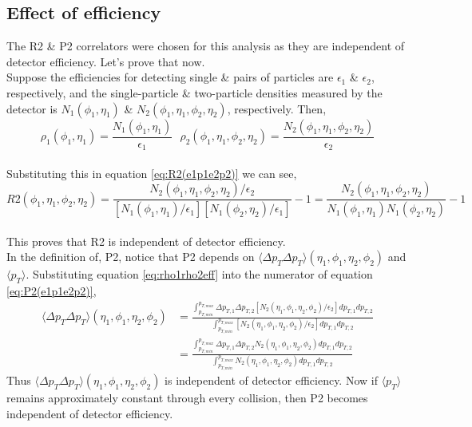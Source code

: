 \documentclass[12pt,a4paper,twoside]{report}
\begin{document}
\subsection{Effect of efficiency}
The R2 \& P2 correlators were chosen for this analysis as they are independent of detector efficiency. Let's prove that now.\\
Suppose the efficiencies for detecting single \& pairs of particles are $\epsilon_1$ \& $\epsilon_2$, respectively, and the single-particle \& two-particle densities measured by the detector is $N_1(\phi_1,\eta_1)$ \& $N_2(\phi_1,\eta_1,\phi_2,\eta_2)$, respectively. Then,
\begin{equation}\label{eq:rho1rho2eff}
	\rho_1(\phi_1,\eta_1)=\frac{N_1(\phi_1,\eta_1)}{\epsilon_1}\ \ \ \rho_2(\phi_1,\eta_1,\phi_2,\eta_2)=\frac{N_2(\phi_1,\eta_1,\phi_2,\eta_2)}{\epsilon_2}
\end{equation}
\\
Substituting this in equation \ref{eq:R2(e1p1e2p2)} we can see,
\begin{equation}
	R2(\phi_1,\eta_1,\phi_2,\eta_2)=\frac{N_2(\phi_1,\eta_1,\phi_2,\eta_2)/\epsilon_2}{[N_1(\phi_1,\eta_1)/\epsilon_1][N_1(\phi_2,\eta_2)/\epsilon_1]}-1=\frac{N_2(\phi_1,\eta_1,\phi_2,\eta_2)}{N_1(\phi_1,\eta_1)N_1(\phi_2,\eta_2)}-1
\end{equation}
\\
This proves that R2 is independent of detector efficiency.\\

In the definition of, P2, notice that P2 depends on $\langle\Delta p_T \Delta p_T\rangle(\eta_1,\phi_1,\eta_2,\phi_2)$ and $\langle p_T\rangle$. 
Substituting equation \ref{eq:rho1rho2eff} into the numerator of equation \ref{eq:P2(e1p1e2p2)},
\begin{align}\nonumber
	\langle\Delta p_T \Delta p_T\rangle(\eta_1,\phi_1,\eta_2,\phi_2)&=\frac{\int_{p_{T,min}}^{p_{T,max}}\Delta p_{T,1}\Delta p_{T,2}[N_2(\eta_1,\phi_1,\eta_2,\phi_2)/\epsilon_2]d p_{T,1}d p_{T,2}}{\int_{p_{T,min}}^{p_{T,max}}[N_2(\eta_1,\phi_1,\eta_2,\phi_2)/\epsilon_2]d p_{T,1}d p_{T,2}}\\&=\frac{\int_{p_{T,min}}^{p_{T,max}}\Delta p_{T,1}\Delta p_{T,2}N_2(\eta_1,\phi_1,\eta_2,\phi_2)d p_{T,1}d p_{T,2}}{\int_{p_{T,min}}^{p_{T,max}}N_2(\eta_1,\phi_1,\eta_2,\phi_2)d p_{T,1}d p_{T,2}}
\end{align}
Thus $\langle\Delta p_T \Delta p_T\rangle(\eta_1,\phi_1,\eta_2,\phi_2)$ is independent of detector efficiency. Now if $\langle p_T\rangle$ remains approximately constant through every collision, then P2 becomes independent of detector efficiency.
\end{document}
